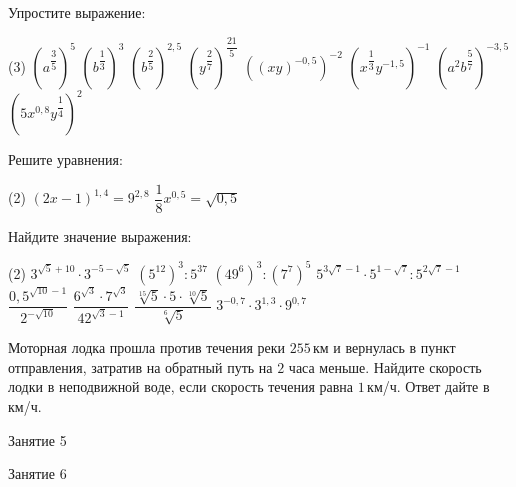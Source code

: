 \begin{homework}[number=2]
	\begin{listofex}
		\item Упростите выражение:
		\begin{tasks}(3)
			\task \( (a^{\dfrac{3}{5}})^5 \)
			\task \( (b^{\dfrac{1}{3}})^3 \)
			\task \( (b^{\dfrac{2}{5}})^{2,5} \)
			\task \( (y^{\dfrac{2}{7}})^{\dfrac{21}{5}} \)
			\task \( ((xy)^{-0,5})^{-2} \)
			\task \( (x^{\dfrac{1}{3}}y^{-1,5})^{-1} \)
			\task \( (a^{2}b^{\dfrac{5}{7}})^{-3,5} \)
			\task \( (5x^{0,8}y^{\dfrac{1}{4}})^{2} \)
		\end{tasks}
		\item Решите уравнения:
		\begin{tasks}(2)
			\task \( (2x-1)^{1,4}=9^{2,8} \)
			\task \( \dfrac{1}{8}x^{0,5} = \sqrt{0,5} \)
		\end{tasks}
		\item Найдите значение выражения:
		\begin{tasks}(2)
			\task \( 3^{\sqrt{5}+10}\cdot3^{-5-\sqrt{5}} \)
			\task \( (5^{12})^3 : 5^{37} \)
			\task \( (49^6)^3:(7^7)^5 \)
			\task \( 5^{3\sqrt{7}-1}\cdot 5^{1-\sqrt{7}}:5^{2\sqrt{7}-1} \)
			\task \( \dfrac{0,5^{\sqrt{10}-1}}{2^{-\sqrt{10}}} \)
			\task \( \dfrac{6^{\sqrt{3}}\cdot7^{\sqrt{3}}}{42^{\sqrt{3}-1}} \)
			\task \( \dfrac{\sqrt[15]{5}\cdot5\cdot\sqrt[10]{5}}{\sqrt[6]{5}} \)
			\task \( 3^{-0,7}\cdot 3^{1,3} \cdot 9^{0,7}\)
		\end{tasks}
		\item Моторная лодка прошла против течения реки \(255\) км и вернулась в пункт отправления, затратив на обратный путь на \(2\) часа меньше. Найдите скорость лодки в неподвижной воде, если скорость течения равна \(1\) км/ч. Ответ дайте в км/ч.
	\end{listofex}
\end{homework}

\begin{class}[number=5]
	\begin{listofex}
		\item Занятие 5
	\end{listofex}
	\end{class}
	
\begin{class}[number=6]
	\begin{listofex}
		\item Занятие 6
	\end{listofex}
\end{class}
	
